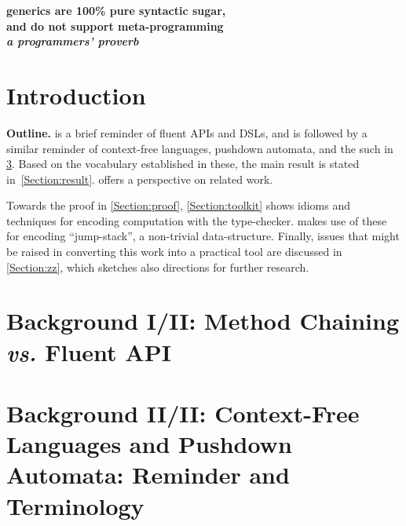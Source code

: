 \documentclass[a4paper,USenglish]{lipics}
\author{Anonymized for the submission}
\begin{document}
\begin{flushright}
    \scriptsize\bfseries
    \protect \Java generics are 100\protect \% pure syntactic sugar, \\
    and do not support meta-programming \\
  
    \footnotesize\mdseries\itshape
    a programmers' proverb
\end{flushright}


\maketitle
\begin{abstract}
  
\end{abstract}

\section{Introduction}


\textbf{Outline.}
 is a brief reminder of fluent APIs 
  and DSLs, and is followed by a similar reminder of 
  context-free languages, pushdown automata, and the such in \cref{Section:pushdown}.
Based on the vocabulary established in these, 
  the main result is stated in~\cref{Section:result}.
 offers a perspective on related work.

Towards the proof in \cref{Section:proof}, \cref{Section:toolkit} 
  shows idioms and techniques for encoding computation with    
  the \Java type-checker.
 makes use of these for encoding 
  ``jump-stack'', a non-trivial data-structure.
Finally, issues that might be raised in converting 
  this work into a practical tool are discussed in \cref{Section:zz},
    which sketches also directions for further research.

\section{Background I/II: Method Chaining \emph{vs.} Fluent API}
\label{Section:fluent}


\section{Background II/II: Context-Free Languages and Pushdown Automata: Reminder and Terminology}
\label{Section:pushdown}

\end{document}

